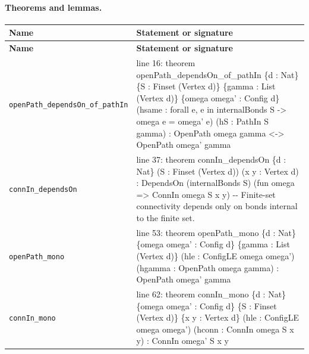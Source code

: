 \documentclass[10pt]{article}
\begin{document}
\paragraph{Theorems and lemmas.}
\begin{longtable}{>{\raggedright\arraybackslash}p{} >{\raggedright\arraybackslash}p{}}
\textbf{Name} & \textbf{Statement or signature} \\
\hline
\endfirsthead
\textbf{Name} & \textbf{Statement or signature} \\
\hline
\endhead
\texttt{openPath\_\allowbreak{}dependsOn\_\allowbreak{}of\_\allowbreak{}pathIn} & {\ttfamily\scriptsize line 16:\allowbreak{} theorem openPath\_\allowbreak{}dependsOn\_\allowbreak{}of\_\allowbreak{}pathIn \{d :\allowbreak{} Nat\} \{S :\allowbreak{} Finset (\allowbreak{}Vertex d)\allowbreak{}\} \{gamma :\allowbreak{} List (\allowbreak{}Vertex d)\allowbreak{}\} \{omega omega' :\allowbreak{} Config d\} (\allowbreak{}hsame :\allowbreak{} forall e,\allowbreak{} e in internalBonds S -\allowbreak{}> omega e =\allowbreak{} omega' e)\allowbreak{} (\allowbreak{}hS :\allowbreak{} PathIn S gamma)\allowbreak{} :\allowbreak{} OpenPath omega gamma <-\allowbreak{}> OpenPath omega' gamma} \\[0.45em]
\texttt{connIn\_\allowbreak{}dependsOn} & {\ttfamily\scriptsize line 37:\allowbreak{} theorem connIn\_\allowbreak{}dependsOn \{d :\allowbreak{} Nat\} (\allowbreak{}S :\allowbreak{} Finset (\allowbreak{}Vertex d)\allowbreak{})\allowbreak{} (\allowbreak{}x y :\allowbreak{} Vertex d)\allowbreak{} :\allowbreak{} DependsOn (\allowbreak{}internalBonds S)\allowbreak{} (\allowbreak{}fun omega =\allowbreak{}> ConnIn omega S x y)\allowbreak{} -\allowbreak{}-\allowbreak{} Finite-\allowbreak{}set connectivity depends only on bonds internal to the finite set.\allowbreak{}} \\[0.45em]
\texttt{openPath\_\allowbreak{}mono} & {\ttfamily\scriptsize line 53:\allowbreak{} theorem openPath\_\allowbreak{}mono \{d :\allowbreak{} Nat\} \{omega omega' :\allowbreak{} Config d\} \{gamma :\allowbreak{} List (\allowbreak{}Vertex d)\allowbreak{}\} (\allowbreak{}hle :\allowbreak{} ConfigLE omega omega')\allowbreak{} (\allowbreak{}hgamma :\allowbreak{} OpenPath omega gamma)\allowbreak{} :\allowbreak{} OpenPath omega' gamma} \\[0.45em]
\texttt{connIn\_\allowbreak{}mono} & {\ttfamily\scriptsize line 62:\allowbreak{} theorem connIn\_\allowbreak{}mono \{d :\allowbreak{} Nat\} \{omega omega' :\allowbreak{} Config d\} \{S :\allowbreak{} Finset (\allowbreak{}Vertex d)\allowbreak{}\} \{x y :\allowbreak{} Vertex d\} (\allowbreak{}hle :\allowbreak{} ConfigLE omega omega')\allowbreak{} (\allowbreak{}hconn :\allowbreak{} ConnIn omega S x y)\allowbreak{} :\allowbreak{} ConnIn omega' S x y} \\[0.45em]

\end{longtable}
\end{document}
